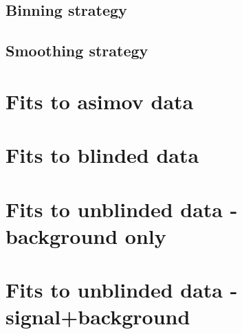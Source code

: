 \documentclass[NOTE, atlasdraft=true, texlive=2016, UKenglish]{atlasdoc}
\begin{document}
\subsection{Binning strategy}%
\label{sec:binning}

\subsection{Smoothing strategy}%
\label{sec:smoothing}


\FloatBarrier
\section{Fits to asimov data}%
\label{sec:asimov}


\FloatBarrier
\section{Fits to blinded data}%
\label{sec:blinded}


\FloatBarrier
\section{Fits to unblinded data - background only}%
\label{sec:unblinded_Bonly}


\FloatBarrier
\section{Fits to unblinded data - signal+background}%
\label{sec:unblinded_SplusB}

\end{document}
